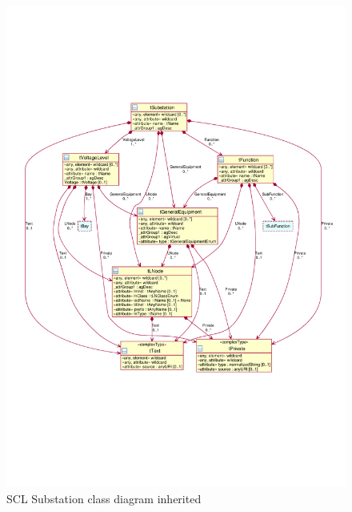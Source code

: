 \begin{figure}
  \includegraphics[width=1.0\linewidth]{chapters/ch-scl/figures/SCL-uml-substation-Deept2-inherited}
  \caption{SCL Substation class diagram inherited  }
  \label{fig:pdf-SCL-uml-substation-Deept2-inherited}
\end{figure}


